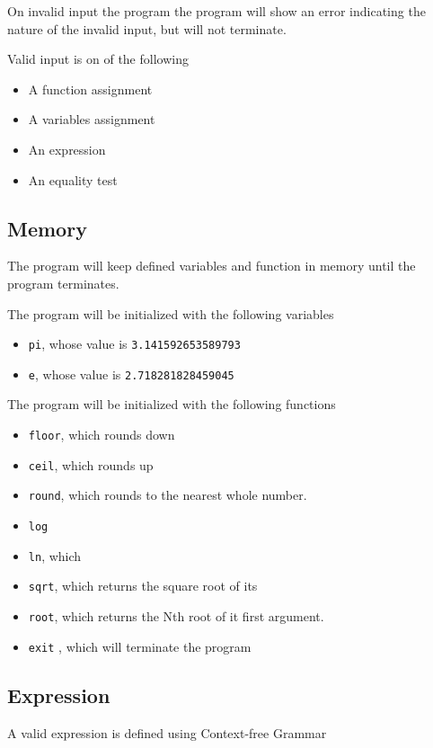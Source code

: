 \documentclass[11pt,a4paper]{article}
\begin{document}
On invalid input the program the program will show an error
indicating the nature of the invalid input, but will not terminate.

Valid input is on of the following
\begin{itemize}
\item A function assignment
\item A variables assignment
\item An expression
\item An equality test
\end{itemize}
\subsection{Memory}
The program will keep defined variables and function in memory
until the program terminates.


The program will be initialized with the following variables
\begin{itemize}
\item \texttt{pi}, whose value is \texttt{3.141592653589793}
\item \texttt{e}, whose value is \texttt{2.718281828459045}
\end{itemize}


The program will be initialized with the following functions
\begin{itemize}
\item \texttt{floor}, which rounds down
\item \texttt{ceil}, which rounds up
\item \texttt{round}, which rounds to the nearest  whole number.
\item \texttt{log}
\item \texttt{ln}, which
\item \texttt{sqrt}, which returns the square root of its
\item \texttt{root}, which returns the Nth root of it first argument.  %
\item \texttt{exit} , which will terminate the program
\end{itemize}



\subsection{Expression}
A valid expression is defined using Context-free Grammar
\end{document}
